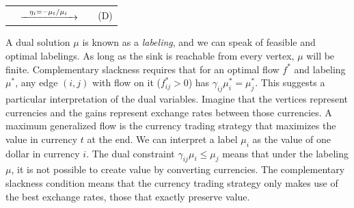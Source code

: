 \documentclass[11pt]{article}
\theoremstyle{definition}
\theoremstyle{definition}
\newcommand{\R}{\mathbb{R}}
\newcommand{\gij}{\gamma_{ij}}
\begin{document}
	\begin{tabular}{rcll}
		\hspace*{-1.05cm}
	\resizebox{0.37\textwidth}{!}{
		\fbox{
	\begin{minipage}{0.35\textwidth}
	\begin{alignat*}{3}
    \text{min} &\quad &\sum_{i \in V \setminus t} b_i \eta_i \\
    \text{s.t.}
    &   &\gij \eta_j - \eta_i &\geq 0 \quad &&\forall\; (i, j) \in E[V \setminus t] \\
    &   &\gamma_{ti} \eta_i &= -1 \quad     &&\forall\; (i, t) \in E \\
    &   &\eta_i &= -\gamma_{it} \quad       &&\forall\; (t, i) \in E \\
    &   &\eta_i &\leq 0 \quad               &&\forall\; i \in V \setminus t
    \end{alignat*}
	\end{minipage}
}
} & 
	$\xrightarrow{\hspace*{0.25cm}\eta_i = - \mu_t / \mu_i\hspace*{0.25cm}}$
	&
	\resizebox{0.37\textwidth}{!}{
		\fbox{
	\begin{minipage}{0.4\textwidth}
    \begin{alignat*}{3}
    \text{max} &\quad &\mu_t &\sum_{j \in V \setminus t} \frac{b_j}{\mu_j}  \\
    \text{s.t.}
    &   &\gij \mu_i &\leq \mu_j \quad &&\forall\; (i, j) \in E \\
    &   &\mu_i &\in \R_{>0} \cup \infty \quad &&\forall\; i \in V \setminus t \\
    &   &\mu_t &\in \R_{>0}
    \end{alignat*}
	\end{minipage}
}
} & \hspace*{0.4cm}(D)
\end{tabular}

        
	A dual solution $\mu$ is known as a \emph{labeling}, and we can speak of feasible and
	optimal labelings. As long as the sink is reachable from every vertex, $\mu$ will be finite.
	Complementary slackness requires that for an optimal flow $f^*$ and labeling $\mu^*$,
	any edge $(i, j)$ with flow on it ($f^*_{ij} > 0$) has $\gamma_{ij}\mu^*_i = \mu^*_j$.
	This suggests a particular interpretation of the dual variables. Imagine that
	the vertices represent currencies and the gains represent exchange rates between those currencies.
	A maximum generalized flow is the currency trading strategy that maximizes the value in currency
	$t$ at the end. We can interpret a label $\mu_i$ as the value of one dollar in currency $i$.
	The dual constraint $\gamma_{ij} \mu_i \leq \mu_j$ means that under the labeling $\mu$,
	it is not possible to create value by converting currencies.
	The complementary slackness condition means that the currency trading strategy
	only makes use of the best exchange rates, those that exactly preserve value.
	
\end{document}
